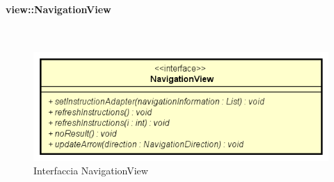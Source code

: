 \documentclass[../DefinizioneDiProdotto.tex]{subfiles}
\begin{document}
\paragraph{view::NavigationView}
\
\begin{figure}[H]
	\centering
	\includegraphics[width=\maxwidth]{img/NavigationView.png}
	\caption{Interfaccia NavigationView}\label{fig:view::NavigationView} 
\end{figure}
\end{document}
